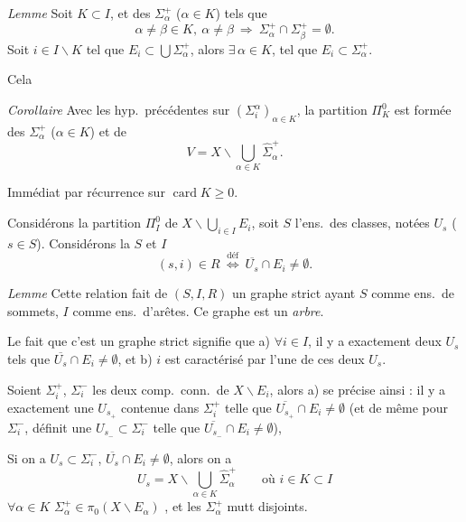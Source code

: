 \documentclass[11pt,a4paper]{article}
\begin{document}
\emph{Lemme} Soit $K\subset I$,  et des
$\Sigma_{\alpha}^{+}$ ($\alpha\in K$) tels que
\[
  \alpha\neq\beta\in K,\ \alpha\neq\beta\ \Rightarrow\ \Sigma_{\alpha}^{+}\cap\Sigma_{\beta}^{+}=\emptyset .
\]
Soit $i\in I\smallsetminus K$ tel que $E_{i}\subset\bigcup\Sigma_{\alpha}^{+}$,
alors  $\exists\,\alpha\in K$, tel que
$E_{i}\subset\Sigma_{\alpha}^{+}$.

Cela   \ill{}

\emph{Corollaire} Avec les hyp.\ précédentes sur
$(\Sigma_{i}^{\alpha})_{\alpha\in K}$, la partition $\Pi_{K}^{0}$ est formée
des $\Sigma_{\alpha}^{+}$ ($\alpha\in K$) et de
\[
  V=X\smallsetminus\bigcup_{\alpha\in K}\widehat{\Sigma}_{\alpha}^{+} .
\]

Immédiat par récurrence sur $\operatorname{card} K\geqslant0$.

Considérons la partition $\Pi_{I}^{0}$ de $X\smallsetminus\bigcup_{i\in
I}E_{i}$, soit $S$ l'ens.\ des classes, notées $U_{s}$ ($s\in S$).
 Considérons la    $S$ et $I$
\[
  (s,i)\in R\ \overset{\text{déf}}{\Longleftrightarrow}\ \overline{U_{s}}\cap E_{i}\neq\emptyset .
\]

\emph{Lemme} Cette relation fait de $(S,I,R)$ un graphe strict ayant $S$
comme ens.\ de sommets, $I$ comme ens.\ d'arêtes. 
Ce graphe est un \emph{arbre}.

Le fait que c'est un graphe strict signifie que a) $\forall i\in I$,
 il y a exactement deux $U_{s}$ tels que
$\overline{U_{s}}\cap E_{i}\neq\emptyset$, et b) $i$ est caractérisé par
l'une de ces deux $U_{s}$.

Soient $\Sigma_{i}^{+}$, $\Sigma_{i}^{-}$ les deux comp.\ conn.\ de
$X\smallsetminus E_{i}$, alors a) se précise ainsi : il y a exactement
 une $U_{s_{+}}$ contenue dans $\Sigma_{i}^{+}$ telle que
$\overline{U_{s_{+}}}\cap E_{i}\neq\emptyset$ (et de même pour
$\Sigma_{i}^{-}$, \ill{} définit une $U_{s_{-}}\subset\Sigma_{i}^{-}$ telle
que $\overline{U_{s_{-}}}\cap E_{i}\neq\emptyset$),

 Si on a $U_{s}\subset\Sigma_{i}^{-}$,
$\overline{U_{s}}\cap E_{i}\neq\emptyset$,  alors on a
\[
  U_{s}=X\smallsetminus\bigcup_{\alpha\in K}\widehat{\Sigma}_{\alpha}^{+}
  \qquad\text{où } i\in K\subset I
\]
$\forall\alpha\in K$
$\Sigma_{\alpha}^{+}\in\pi_{0}(X\smallsetminus E_{\alpha})$ ,
et les $\Sigma_{\alpha}^{+}$ mutt disjoints.
\end{document}
